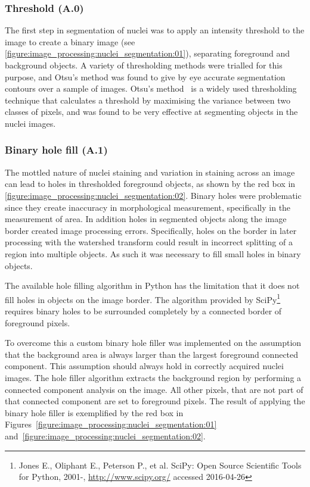 \subsubsection{Threshold (A.0)}
The first step in segmentation of nuclei was to apply an intensity threshold to the image to create a binary image (see \autoref{figure:image_processing:nuclei_segmentation:01}), separating foreground and background objects. A variety of thresholding methods were trialled for this purpose, and Otsu's method was found to give by eye accurate segmentation contours over a sample of images. Otsu's method~\cite{Otsu1979} is a widely used thresholding technique that calculates a threshold by maximising the variance between two classes of pixels, and was found to be very effective at segmenting objects in the nuclei images.

\subsubsection{Binary hole fill (A.1)}
The mottled nature of nuclei staining and variation in staining across an image can lead to holes in thresholded foreground objects, as shown by the red box in \autoref{figure:image_processing:nuclei_segmentation:02}. Binary holes were problematic since they create inaccuracy in morphological measurement, specifically in the measurement of area. In addition holes in segmented objects along the image border created image processing errors. Specifically, holes on the border in later processing with the watershed transform could result in incorrect splitting of a region into multiple objects. As such it was necessary to fill small holes in binary objects.

The available hole filling algorithm in Python has the limitation that it does not fill holes in objects on the image border. The algorithm provided by SciPy\footnote{Jones E., Oliphant E., Peterson P., et al. SciPy: Open Source Scientific Tools for Python, 2001-, \url{http://www.scipy.org/} accessed 2016-04-26} requires binary holes to be surrounded completely by a connected border of foreground pixels.

To overcome this a custom binary hole filler was implemented on the assumption that the background area is always larger than the largest foreground connected component. This assumption should always hold in correctly acquired nuclei images. The hole filler algorithm extracts the background region by performing a connected component analysis on the image. All other pixels, that are not part of that connected component are set to foreground pixels. The result of applying the binary hole filler is exemplified by the red box in Figures~\ref{figure:image_processing:nuclei_segmentation:01} and~\ref{figure:image_processing:nuclei_segmentation:02}.

